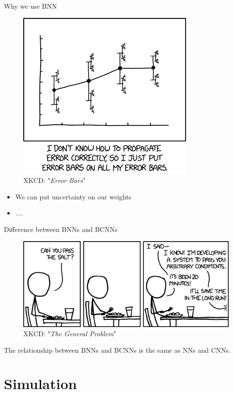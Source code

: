 \documentclass{beamer}
\begin{document}
\begin{frame}{Why we use BNN}
	\begin{multicols}{2}
		\begin{figure}
			\includegraphics[width=.45\textwidth]{../Images/xkcd_error_bars.png}
			\caption{XKCD: "\textit{Error Bars}" \cite{xkcd-self-driving}}
		\end{figure}
		
		\columnbreak
		
		\null \vfill
		\begin{itemize}
			\item We can put uncertainty on our weights
			\item ....
		\end{itemize}
		\vfill \null
	\end{multicols}
\end{frame}

\begin{frame}{Difference between BNNs and BCNNs}
	\begin{figure}
		\includegraphics[width=.75\textwidth]{../Images/the_general_problem.png}
		\caption{ XKCD: "\textit{The General Problem}" \cite{xkcd-general-problem}}
	\end{figure}
		The relationship between BNNs and BCNNs is the same as NNs and CNNs.
\end{frame}


\section{Simulation}
\end{document}
